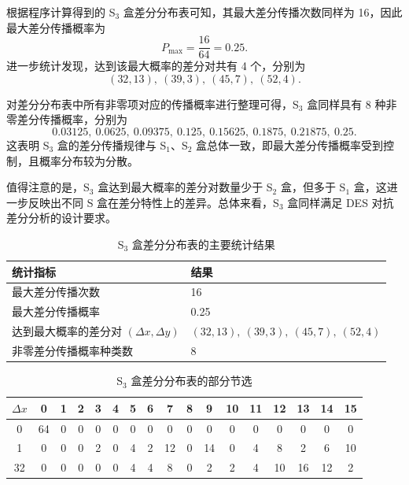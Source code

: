 根据程序计算得到的 S$_3$ 盒差分分布表可知，其最大差分传播次数同样为 16，因此最大差分传播概率为
\[
P_{\max}=\frac{16}{64}=0.25.
\]
进一步统计发现，达到该最大概率的差分对共有 4 个，分别为
\[
(32,13),\ (39,3),\ (45,7),\ (52,4).
\]

对差分分布表中所有非零项对应的传播概率进行整理可得，S$_3$ 盒同样具有 8 种非零差分传播概率，分别为
\[
0.03125,\ 0.0625,\ 0.09375,\ 0.125,\ 0.15625,\ 0.1875,\ 0.21875,\ 0.25.
\]
这表明 S$_3$ 盒的差分传播规律与 S$_1$、S$_2$ 盒总体一致，即最大差分传播概率受到控制，且概率分布较为分散。

值得注意的是，S$_3$ 盒达到最大概率的差分对数量少于 S$_2$ 盒，但多于 S$_1$ 盒，这进一步反映出不同 S 盒在差分特性上的差异。总体来看，S$_3$ 盒同样满足 DES 对抗差分分析的设计要求。
\begin{table}[H]
    \centering
    \caption{S$_3$ 盒差分分布表的主要统计结果}
    \label{tab:s3-summary}
    \begin{tabular}{p{6cm}p{8cm}}
        \hline
        统计指标 & 结果 \\
        \hline
        最大差分传播次数 & 16 \\
        最大差分传播概率 & 0.25 \\
        达到最大概率的差分对 $(\Delta x,\Delta y)$ 
        & $(32,13),\ (39,3),\ (45,7),\ (52,4)$ \\
        非零差分传播概率种类数 & 8 \\
        \hline
    \end{tabular}
\end{table}
\begin{table}[H]
    \centering
    \caption{S$_3$ 盒差分分布表的部分节选}
    \label{tab:s3-ddt-sample}
    \scriptsize
    \setlength{\tabcolsep}{4pt}
    \begin{tabular}{c|cccccccccccccccc}
        \hline
        $\Delta x$ & 0 & 1 & 2 & 3 & 4 & 5 & 6 & 7 & 8 & 9 & 10 & 11 & 12 & 13 & 14 & 15 \\
        \hline
        0  & 64 & 0 & 0 & 0 & 0 & 0 & 0 & 0 & 0 & 0 & 0 & 0 & 0 & 0 & 0 & 0 \\
        1  & 0 & 0 & 0 & 2 & 0 & 4 & 2 & 12 & 0 & 14 & 0 & 4 & 8 & 2 & 6 & 10 \\
        32 & 0 & 0 & 0 & 0 & 0 & 4 & 4 & 8 & 0 & 2 & 2 & 4 & 10 & 16 & 12 & 2 \\
        \hline
    \end{tabular}
\end{table}
